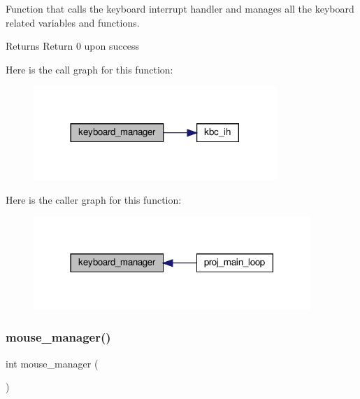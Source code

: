 Function that calls the keyboard interrupt handler and manages all the keyboard related variables and functions. 

\begin{DoxyReturn}{Returns}
Return 0 upon success 
\end{DoxyReturn}
Here is the call graph for this function\+:
\nopagebreak
\begin{figure}[H]
\begin{center}
\leavevmode
\includegraphics[width=260pt]{group__main__functions_gaaf064e0d3192ae8797d78dcb08bc838e_cgraph}
\end{center}
\end{figure}
Here is the caller graph for this function\+:
\nopagebreak
\begin{figure}[H]
\begin{center}
\leavevmode
\includegraphics[width=297pt]{group__main__functions_gaaf064e0d3192ae8797d78dcb08bc838e_icgraph}
\end{center}
\end{figure}
\mbox{\label{group__main__functions_ga8c9f11a032076f800d5d8e3faea17c9a}} 
\subsubsection{\texorpdfstring{mouse\+\_\+manager()}{mouse\_manager()}}
{\footnotesize\ttfamily int mouse\+\_\+manager (\begin{DoxyParamCaption}{ }\end{DoxyParamCaption})}



